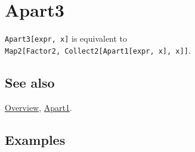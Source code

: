 \documentclass[../FeynCalcManual.tex]{subfiles}
\begin{document}
\hypertarget{apart3}{
\section{Apart3}\label{apart3}}

\texttt{Apart3[\allowbreak{}expr,\ \allowbreak{}x]} is equivalent to
\texttt{Map2[\allowbreak{}Factor2,\ \allowbreak{}Collect2[\allowbreak{}Apart1[\allowbreak{}expr,\ \allowbreak{}x],\ \allowbreak{}x]]}.

\subsection{See also}

\hyperlink{toc}{Overview}, \hyperlink{apart1}{Apart1}.

\subsection{Examples}
\end{document}
